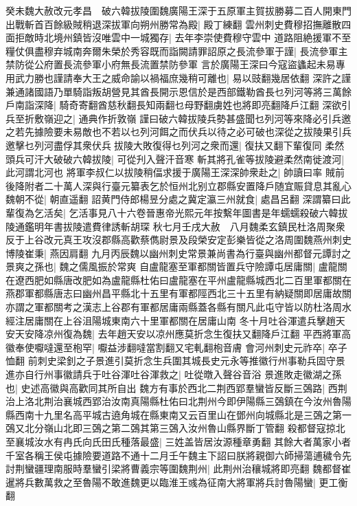 癸未魏大赦改元孝昌　破六韓拔陵圍魏廣陽王深于五原軍主賀拔勝募二百人開東門出戰斬首百餘級賊稍退深拔軍向朔州勝常為殿|{
	殿丁練翻}
雲州刺史費穆招撫離散四面拒敵時北境州鎮皆沒唯雲中一城獨存|{
	去年李崇使費穆守雲中}
道路阻絶援軍不至糧仗俱盡穆弃城南奔爾朱榮於秀容既而詣闕請罪詔原之長流參軍于謹|{
	長流參軍主禁防從公府置長流參軍小府無長流置禁防參軍}
言於廣陽王深曰今寇盜蠭起未易專用武力勝也謹請奉大王之威命諭以禍福庶幾稍可離也|{
	易以豉翻幾居依翻}
深許之謹兼通諸國語乃單騎詣叛胡營見其酋長開示恩信於是西部鐵勒酋長乜列河等將三萬餘戶南詣深降|{
	騎奇寄翻酋慈秋翻長知兩翻乜母野翻虜姓也將即亮翻降戶江翻}
深欲引兵至折敷嶺迎之|{
	通典作折敦嶺}
謹曰破六韓拔陵兵勢甚盛聞乜列河等來降必引兵邀之若先據險要未易敵也不若以乜列河餌之而伏兵以待之必可破也深從之拔陵果引兵邀擊乜列河盡俘其衆伏兵拔陵大敗復得乜列河之衆而還|{
	復扶又翻下輩復同}
柔然頭兵可汗大破破六韓拔陵|{
	可從刋入聲汗音寒}
斬其將孔雀等拔陵避柔然南徙渡河|{
	此河謂北河也}
將軍李叔仁以拔陵稍偪求援于廣陽王深深帥衆赴之|{
	帥讀曰率}
賊前後降附者二十萬人深與行臺元纂表乞於恒州北别立郡縣安置降戶随宜賑貸息其亂心魏朝不從|{
	朝直遥翻}
詔黄門侍郎楊昱分處之冀定瀛三州就食|{
	處昌呂翻}
深謂纂曰此輩復為乞活矣|{
	乞活事見八十六卷晉惠帝光熙元年按繫年圖書是年蠕蠕殺破六韓拔陵通鑑明年書拔陵遣費律誘斬胡琛}
秋七月壬戌大赦　八月魏柔玄鎮民杜洛周聚衆反于上谷改元真王攻沒郡縣高歡蔡儁尉景及段榮安定彭樂皆從之洛周圍魏燕州刺史博陵崔秉|{
	燕因肩翻}
九月丙辰魏以幽州刺史常景兼尚書為行臺與幽州都督元譚討之景爽之孫也|{
	魏之儒風振於常爽}
自盧龍塞至軍都關皆置兵守險譚屯居庸關|{
	盧龍關在遼西肥如縣唐改肥如為盧龍縣杜佑曰盧龍塞在平州盧龍縣城西北二百里軍都關在燕郡軍都縣唐志曰幽州昌平縣北十五里有軍都陘西北三十五里有納疑關即居庸故關亦謂之軍都關考之漢志上谷郡有軍都居庸兩縣蓋各縣有關凡此屯守皆以防杜洛周水經注居庸關在上谷沮陽城東南六十里軍都關在居庸山南}
冬十月吐谷渾遣兵擊趙天安天安降凉州復為魏|{
	去年趙天安以凉州應莫折念生復扶又翻降戶江翻}
平西將軍高徽奉使嚈噠還至枹罕|{
	嚈益涉翻噠當割翻又宅軋翻枹音膚}
會河州刺史元祚卒|{
	卒子恤翻}
前刺史梁釗之子景進引莫折念生兵圍其城長史元永等推徽行州事勒兵固守景進亦自行州事徽請兵于吐谷渾吐谷渾救之|{
	吐從暾入聲谷音浴}
景進敗走徽湖之孫也|{
	史述高徽與高歡同其所自出}
魏方有事於西北二荆西郢羣蠻皆反斷三鵶路|{
	西荆治上洛北荆治襄城西郢治汝南真陽縣杜佑曰北荆州今即伊陽縣三鵶鎮在今汝州魯陽縣西南十九里名高平城古遶角城在縣東南又云百里山在鄧州向城縣北是三鵶之第一鵶又北分嶺山北即三鵶之第二鵶其第三鵶入汝州魯山縣界斷丁管翻}
殺都督寇掠北至襄城汝水有冉氏向氏田氏種落最盛|{
	三姓盖皆居汝源種章勇翻}
其餘大者萬家小者千室各稱王侯屯據險要道路不通十二月壬午魏主下詔曰朕將親御六師掃蕩逋穢令先討荆蠻疆理南服時羣蠻引梁將曹義宗等圍魏荆州|{
	此荆州治穰城將即亮翻}
魏都督崔暹將兵數萬救之至魯陽不敢進魏更以臨淮王彧為征南大將軍將兵討魯陽蠻|{
	更工衡翻}
